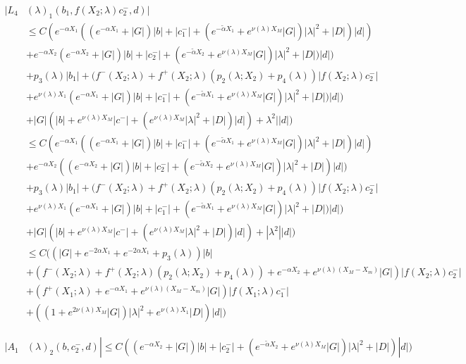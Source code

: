 \documentclass[12pt]{article}
\begin{document}
\begin{enumerate}
\begin{align*}
|L_4&(\lambda)_1(b_1, f(X_2; \lambda) c_2^-, d)|\\ 
&\leq C ( e^{-\alpha X_1}( (e^{-\alpha X_1} + |G|) |b| + |c_1^-| + (e^{-\tilde{\alpha} X_1} + e^{\nu(\lambda)X_M} |G|) |\lambda|^2 + |D|) |d| )\\
&+ e^{-\alpha X_2} (e^{-\alpha X_2} + |G|) |b| + |c_2^-| + (e^{-\tilde{\alpha} X_2} + e^{\nu(\lambda)X_M} |G|) |\lambda|^2 + |D|) |d| ) \\
&+ p_3(\lambda) |b_1| + (f^-(X_2; \lambda) + f^+(X_2; \lambda) (p_2(\lambda; X_2) + p_4(\lambda)) | f(X_2; \lambda) c_2^-| \\
&+ e^{\nu(\lambda)X_1} (e^{-\alpha X_1} + |G|) |b| + |c_1^-| + (e^{-\tilde{\alpha} X_1} + e^{\nu(\lambda)X_M} |G|) |\lambda|^2 + |D|) |d| ) \\
&+ |G| (|b| + e^{\nu(\lambda)X_M}|c^-| + (e^{\nu(\lambda)X_M} |\lambda|^2 + |D|)|d| ) + \lambda^2||d|) \\
&\leq C ( e^{-\alpha X_1}( (e^{-\alpha X_1} + |G|) |b| + |c_1^-| + (e^{-\tilde{\alpha} X_1} + e^{\nu(\lambda)X_M} |G|) |\lambda|^2 + |D|) |d| )\\
&+ e^{-\alpha X_2} ((e^{-\alpha X_2} + |G|) |b| + |c_2^-| + (e^{-\tilde{\alpha} X_2} + e^{\nu(\lambda)X_M} |G|) |\lambda|^2 + |D|) |d| ) \\
&+ p_3(\lambda) |b_1| + (f^-(X_2; \lambda) + f^+(X_2; \lambda) (p_2(\lambda; X_2) + p_4(\lambda)) | f(X_2; \lambda) c_2^-| \\
&+ e^{\nu(\lambda)X_1} (e^{-\alpha X_1} + |G|) |b| + |c_1^-| + (e^{-\tilde{\alpha} X_1} + e^{\nu(\lambda)X_M} |G|) |\lambda|^2 + |D|) |d| ) \\
&+ |G| (|b| + e^{\nu(\lambda)X_M}|c^-| + (e^{\nu(\lambda)X_M} |\lambda|^2 + |D|)|d| ) + |\lambda^2||d|) \\
&\leq C( (|G| + e^{-2\alpha X_1} + e^{-2\alpha X_1} + p_3(\lambda))|b| \\
&+ (f^-(X_2; \lambda) + f^+(X_2; \lambda) (p_2(\lambda; X_2) + p_4(\lambda)) + e^{-\alpha X_2} + e^{\nu(\lambda)(X_M - X_m)}|G|)| f(X_2; \lambda) c_2^-| \\
&+ (f^+(X_1; \lambda) + e^{-\alpha X_1} + e^{\nu(\lambda)(X_M - X_m)}|G|)| f(X_1; \lambda) c_1^-| \\
&+ ((1 + e^{2 \nu(\lambda) X_M }|G|)|\lambda|^2 + e^{\nu(\lambda)X_1}|D|)|d| )
\end{align*}



\begin{align*}
|A_1&(\lambda)_2(b, c_2^-, d)| \leq C( (e^{-\alpha X_2} + |G|) |b| + |c_2^-| + (e^{-\tilde{\alpha} X_2} + e^{\nu(\lambda)X_M} |G|) |\lambda|^2 + |D|) |d| )
\end{align*}


\end{enumerate}
\end{document}
